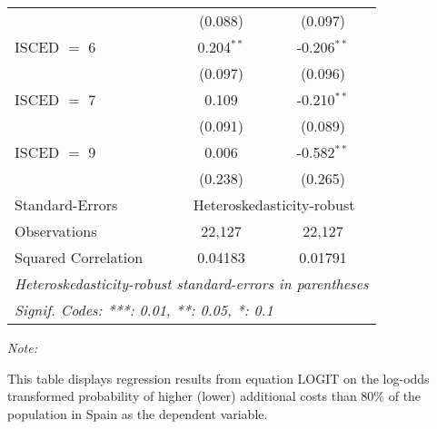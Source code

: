 \begin{table}[htbp!]
\begin{adjustbox}{width = 1\textwidth, max height = 0.95\textheight, center}
\begin{threeparttable}[b]
\begin{tabular}{lcc}
                                 & (0.088)        & (0.097)\\   
            ISCED $=$ 6          & 0.204$^{**}$   & -0.206$^{**}$\\   
                                 & (0.097)        & (0.096)\\   
            ISCED $=$ 7          & 0.109          & -0.210$^{**}$\\   
                                 & (0.091)        & (0.089)\\   
            ISCED $=$ 9          & 0.006          & -0.582$^{**}$\\   
                                 & (0.238)        & (0.265)\\   
            \midrule 
            Standard-Errors & \multicolumn{2}{c}{Heteroskedasticity-robust} \\ 
            Observations         & 22,127         & 22,127\\  
            Squared Correlation  & 0.04183        & 0.01791\\  
            \midrule \midrule
            \multicolumn{3}{l}{\emph{Heteroskedasticity-robust standard-errors in parentheses}}\\
            \multicolumn{3}{l}{\emph{Signif. Codes: ***: 0.01, **: 0.05, *: 0.1}}\\
         \end{tabular}
         
         \begin{tablenotes}\item \medskip \textit{Note:}
            \item This table displays regression results from equation LOGIT on the log-odds transformed probability of higher (lower) additional costs than 80\% of the population in Spain as the dependent variable. 
         \end{tablenotes}
      \end{threeparttable}
   \end{adjustbox}
\end{table}


